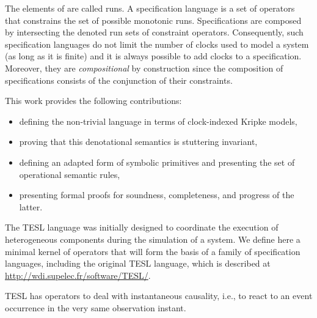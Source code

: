 \begin{isabellebody}
\begin{isamarkuptext}
\end{isamarkuptext}\isamarkuptrue%
%
\begin{isamarkuptext}%
The elements of \isa{{\isasymSigma}\isactrlsup {\isasyminfinity}} are called runs. A specification language is a set of 
  operators that constrains the set of possible monotonic runs. Specifications are composed by 
  intersecting the denoted run sets of constraint operators.
  Consequently, such specification languages do not limit the number of clocks used to model a 
  system (as long as it is finite) and it is always possible to add clocks to a specification. 
  Moreover, they are \emph{compositional} by construction since the composition of specifications 
  consists of the conjunction of their constraints.%
\end{isamarkuptext}\isamarkuptrue%
%
\begin{isamarkuptext}%
This work provides the following contributions:

%
\begin{itemize}%
\item defining the non-trivial language  in terms of clock-indexed Kripke models, 

\item proving that this denotational semantics is stuttering invariant,

\item defining an adapted form of symbolic primitives and presenting the set of operational 
semantic rules,

\item presenting formal proofs for soundness, completeness, and progress of the latter.%
\end{itemize}%
\end{isamarkuptext}\isamarkuptrue%
%
\isadelimdocument
%
\endisadelimdocument
%
\isatagdocument
%
\isamarkuptrue%
%
\endisatagdocument
{\isafolddocument}%
%
\isadelimdocument
%
\endisadelimdocument
%
\begin{isamarkuptext}%
The TESL language \cite{BouJacHarPro2014MEMOCODE} was initially designed to coordinate the
  execution of heterogeneous components during the simulation of a system. We define here a minimal
  kernel of operators that will form the basis of a family of specification languages, including the
  original TESL language, which is described at \url{http://wdi.supelec.fr/software/TESL/}.%
\end{isamarkuptext}\isamarkuptrue%
%
\isadelimdocument
%
\endisadelimdocument
%
\isatagdocument
%
\isamarkuptrue%
%
\endisatagdocument
{\isafolddocument}%
%
\isadelimdocument
%
\endisadelimdocument
%
\begin{isamarkuptext}%
TESL has operators to deal with instantaneous causality, i.e., to react to an event occurrence
in the very same observation instant.


\end{isamarkuptext}
\end{isabellebody}
